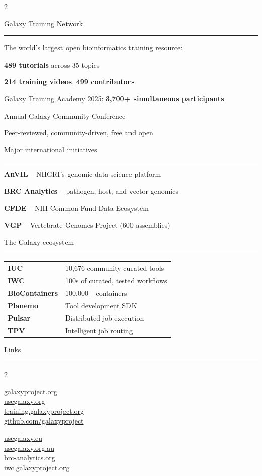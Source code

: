 \documentclass[11pt]{article}
\DeclareRobustCommand{\sbseries}{\fontseries{sb}\selectfont}
\let\olditemize\itemize
\let\oldenditemize\enditemize
\renewenvironment{itemize}{%
  \olditemize
  \setlength{\itemsep}{1pt}%
  \setlength{\parskip}{0pt}%
  \setlength{\parsep}{0pt}%
  \setlength{\topsep}{2pt}%
  \setlength{\leftmargin}{6pt}%
  \renewcommand{\labelitemi}{--}%
}{%
  \oldenditemize
}
\newcommand{\sect}[1]{%
  \vspace{8pt}%
  {\color{galaxydark}\large\sbseries #1}\\[-2pt]%
  {\color{galaxyorange}\rule{\linewidth}{1.5pt}}%
  \vspace{4pt}%
}
\begin{document}
\begin{multicols}{2}
\columnbreak

\sect{Galaxy Training Network}
The world's largest open bioinformatics training resource:
\begin{itemize}
  \item \textbf{489 tutorials} across 35 topics
  \item \textbf{214 training videos}, \textbf{499 contributors}
  \item Galaxy Training Academy 2025: \textbf{3,700+ simultaneous participants}
  \item Annual Galaxy Community Conference
  \item Peer-reviewed, community-driven, free and open
\end{itemize}

\sect{Major international initiatives}
\begin{itemize}
  \item \textbf{AnVIL} -- NHGRI's genomic data science platform
  \item \textbf{BRC Analytics} -- pathogen, host, and vector genomics
  \item \textbf{CFDE} -- NIH Common Fund Data Ecosystem
  \item \textbf{VGP} -- Vertebrate Genomes Project (600 assemblies)
\end{itemize}

\sect{The Galaxy ecosystem}
{\small
\begin{tabularx}{\linewidth}{lX}
\textbf{IUC} & 10,676 community-curated tools \\
\textbf{IWC} & 100s of curated, tested workflows \\
\textbf{BioContainers} & 100,000+ containers \\
\textbf{Planemo} & Tool development SDK \\
\textbf{Pulsar} & Distributed job execution \\
\textbf{TPV} & Intelligent job routing \\
\end{tabularx}}

\sect{Links}
\begin{multicols}{2}
{\small
\url{galaxyproject.org}\\
\url{usegalaxy.org}\\
\url{training.galaxyproject.org}\\
\url{github.com/galaxyproject}

\columnbreak

\url{usegalaxy.eu}\\
\url{usegalaxy.org.au}\\
\url{brc-analytics.org}\\
\url{iwc.galaxyproject.org}
}
\end{multicols}

\end{multicols}
\end{document}
